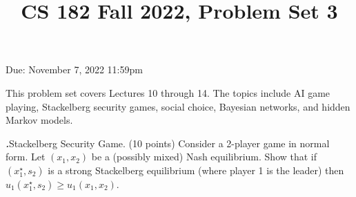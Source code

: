 \documentclass[12pt]{amsart}
\title{CS 182 Fall 2022, Problem Set 3}
\newenvironment{statement}[1]{\smallskip\noindent\color[rgb]{0.0,0.0,0.0} {\bf #1.}}{}
\newcommand{\1}{\mathds{1}}
\begin{document}

\maketitle

\vspace*{-0.25in}
\centerline{Due: November 7, 2022 11:59pm}


\begin{center}
\end{center}
\vspace*{0.15in}


\noindent This problem set covers Lectures 10 through 14. The topics include AI game playing, Stackelberg security games, social choice, Bayesian networks, and hidden Markov models.
\vspace*{0.35in}

\begin{statement}{1} \emph{Stackelberg Security Game.} (10 points) Consider a 2-player game in normal form. Let $(x_1,x_2)$ be a (possibly mixed) Nash equilibrium. Show that if $(x_1^\star,s_2)$ is a strong Stackelberg equilibrium (where player 1 is the leader) then $u_1(x_1^\star,s_2)\geq u_1(x_1,x_2)$.
\end{statement}

\newpage
\end{document}
